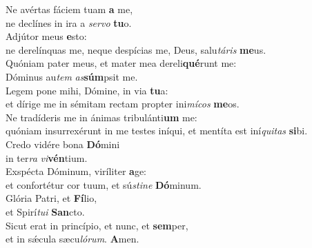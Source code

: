 \evenverse Ne avértas fáciem tuam \textbf{a} me,~\*\\
\evenverse ne declínes in ira a \textit{ser}\textit{vo} \textbf{tu}o.\\
\oddverse Adjútor meus \textbf{e}sto:~\*\\
\oddverse ne derelínquas me, neque despícias me, Deus, salu\textit{tá}\textit{ris} \textbf{me}us.\\
\evenverse Quóniam pater meus, et mater mea dereli\textbf{qué}runt me:~\*\\
\evenverse Dóminus au\textit{tem} \textit{as}\textbf{súm}psit me.\\
\oddverse Legem pone mihi, Dómine, in via \textbf{tu}a:~\*\\
\oddverse et dírige me in sémitam rectam propter ini\textit{mí}\textit{cos} \textbf{me}os.\\
\evenverse Ne tradíderis me in ánimas tribulánti\textbf{um} me:~\*\\
\evenverse quóniam insurrexérunt in me testes iníqui, et mentíta est iní\textit{qui}\textit{tas} \textbf{si}bi.\\
\oddverse Credo vidére bona \textbf{Dó}mini~\*\\
\oddverse in ter\textit{ra} \textit{vi}\textbf{vén}tium.\\
\evenverse Exspécta Dóminum, viríliter \textbf{a}ge:~\*\\
\evenverse et confortétur cor tuum, et sú\textit{sti}\textit{ne} \textbf{Dó}minum.\\
\oddverse Glória Patri, et \textbf{Fí}lio,~\*\\
\oddverse et Spirí\textit{tu}\textit{i} \textbf{San}cto.\\
\evenverse Sicut erat in princípio, et nunc, et \textbf{sem}per,~\*\\
\evenverse et in sǽcula sæcu\textit{ló}\textit{rum}. \textbf{A}men.\\
